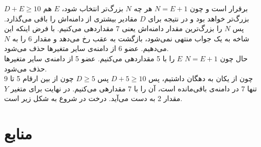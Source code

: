 \documentclass{article}
\begin{document}
$D+E \ge 10$
برقرار است و چون
$N=E+1$
هر چه $N$ بزرگ‌تر انتخاب شود، $E$ هم بزرگ‌تر خواهد بود و در نتیجه برای $D$ مقادیر بیشتری از دامنه‌اش را باقی می‌گذارد. پس $N$ را بزرگ‌ترین مقدار دامنه‌اش یعنی 7 مقداردهی می‌کنیم. با فرض اینکه این شاخه به یک جواب منتهی نمی‌شود، بازگشت به عقب رخ می‌دهد و مقدار 6 را به $N$ می‌دهیم. عضو 6 از دامنه‌ی سایر متغیرها حذف می‌شود.\\
حال چون 
$N=E+1$
$E$ را با 5 مقداردهی می‌کنیم. عضو 5 از دامنه‌ی سایر متغیرها حذف می‌شود.\\
چون از یکان به دهگان  داشتیم، پس 
$D+5 \ge 10$
پس 
$D \ge 5$
چون از بین ارقام 5 تا 9 تنها 7 در دامنه‌ی  باقی‌مانده است، آن را با 7 مقدارهی می‌کنیم. در نهایت برای متغیر $Y$ مقدار 2 به دست می‌آید. درخت در شروع به شکل زیر است.

\section*{منابع}
\renewcommand{\section}[2]{}%
\begin{thebibliography}{99} %


\begin{LTRitems}

\resetlatinfont

\end{LTRitems}

\end{thebibliography}
\end{document}

